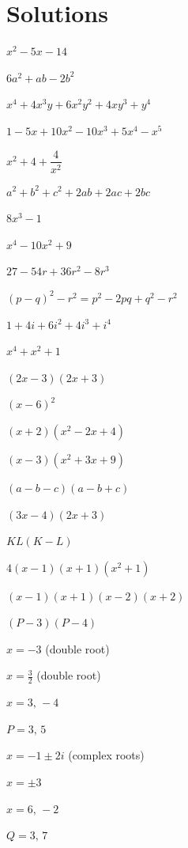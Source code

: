 \section{Solutions}

\begin{solutions}
  \item $x^{2}-5x-14$
  \item $6a^{2}+ab-2b^{2}$
  \item $x^{4}+4x^{3}y+6x^{2}y^{2}+4xy^{3}+y^{4}$
  \item $1-5x+10x^{2}-10x^{3}+5x^{4}-x^{5}$
  \item $x^{2}+4+\dfrac{4}{x^{2}}$
  \item $a^{2}+b^{2}+c^{2}+2ab+2ac+2bc$
  \item $8x^{3}-1$
  \item $x^{4}-10x^{2}+9$
  \item $27-54r+36r^{2}-8r^{3}$
  \item $(p-q)^{2}-r^{2}=p^{2}-2pq+q^{2}-r^{2}$
  \item $1+4i+6i^{2}+4i^{3}+i^{4}$
  \item $x^{4}+x^{2}+1$
  \item $(2x-3)(2x+3)$
  \item $(x-6)^{2}$
  \item $(x+2)(x^{2}-2x+4)$
  \item $(x-3)(x^{2}+3x+9)$
  \item $(a-b-c)(a-b+c)$
  \item $(3x-4)(2x+3)$
  \item $KL(K-L)$
  \item $4(x-1)(x+1)(x^{2}+1)$
  \item $(x-1)(x+1)(x-2)(x+2)$
  \item $(P-3)(P-4)$
  \item $x=-3$ (double root)
  \item $x=\tfrac32$ (double root)
  \item $x=3,\,-4$
  \item $P=3,\,5$
  \item $x=-1\pm 2i$ (complex roots)
  \item $x=\pm 3$
  \item $x=6,\,-2$
  \item $Q=3,\,7$
\end{solutions}
